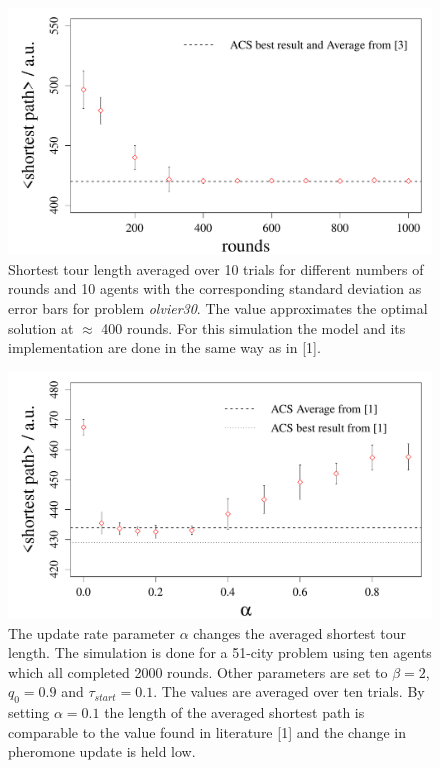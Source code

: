 \begin{figure}[H]
\begin{center}
\includegraphics[width=1\linewidth]{rounds_vs_shortestpath_oli}
\caption{Shortest tour length averaged over 10 trials for different numbers of rounds and 10 agents with the corresponding standard deviation as error bars for problem \textit{olvier30}. The value approximates the optimal solution at $\approx$ 400 rounds. For this simulation the model and its implementation are done in the same way as in [1].}
\label{fig:roundspoli}
\end{center}
\end{figure}
\begin{figure}[H]
\begin{center}
\includegraphics[width=1\linewidth]{alpha_vs_shortestpath}
\caption{The update rate parameter $\alpha$ changes the averaged shortest tour length. The simulation is done for a 51-city problem using ten agents which all completed 2000 rounds. Other parameters are set to $\beta=2$, $q_0=0.9$ and $\tau_{start}=0.1$. The values are averaged over ten trials. By setting $\alpha=0.1$ the length of the averaged shortest path is comparable to the value found in literature [1] and the change in pheromone update is held low.}
\label{fig:alphasp}
\end{center}
\end{figure}
